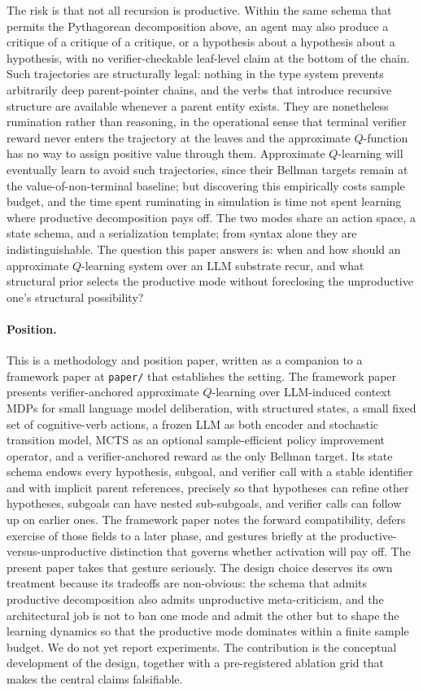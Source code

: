 The risk is that not all recursion is productive. Within the same
schema that permits the Pythagorean decomposition above, an agent may
also produce a critique of a critique of a critique, or a hypothesis
about a hypothesis about a hypothesis, with no verifier-checkable
leaf-level claim at the bottom of the chain. Such trajectories are
structurally legal: nothing in the type system prevents arbitrarily
deep parent-pointer chains, and the verbs that introduce recursive
structure are available whenever a parent entity exists. They are
nonetheless rumination rather than reasoning, in the operational
sense that terminal verifier reward never enters the trajectory at
the leaves and the approximate $Q$-function has no way to assign
positive value through them. Approximate $Q$-learning will eventually
learn to avoid such trajectories, since their Bellman targets remain
at the value-of-non-terminal baseline; but discovering this empirically
costs sample budget, and the time spent ruminating in simulation is
time not spent learning where productive decomposition pays off. The
two modes share an action space, a state schema, and a serialization
template; from syntax alone they are indistinguishable. The question
this paper answers is: when and how should an approximate $Q$-learning
system over an LLM substrate recur, and what structural prior selects
the productive mode without foreclosing the unproductive one's
structural possibility?

\paragraph{Position.}
This is a methodology and position paper, written as a companion to a
framework paper at \texttt{paper/} that establishes the setting. The
framework paper presents verifier-anchored approximate $Q$-learning
over LLM-induced context MDPs for small language model deliberation,
with structured states, a small fixed set of cognitive-verb actions,
a frozen LLM as both encoder and stochastic transition model, MCTS
as an optional sample-efficient policy improvement operator, and a
verifier-anchored reward as the only Bellman target. Its state schema
endows every hypothesis, subgoal, and verifier call with a stable
identifier and with implicit parent references, precisely so that
hypotheses can refine other hypotheses, subgoals can have nested
sub-subgoals, and verifier calls can follow up on earlier ones. The
framework paper notes the forward compatibility, defers exercise of
those fields to a later phase, and gestures briefly at the
productive-versus-unproductive distinction that governs whether
activation will pay off. The present paper takes that gesture
seriously. The design choice deserves its own treatment because its
tradeoffs are non-obvious: the schema that admits productive
decomposition also admits unproductive meta-criticism, and the
architectural job is not to ban one mode and admit the other but
to shape the learning dynamics so that the productive mode dominates
within a finite sample budget. We do not yet report experiments. The
contribution is the conceptual development of the design, together
with a pre-registered ablation grid that makes the central claims
falsifiable.

